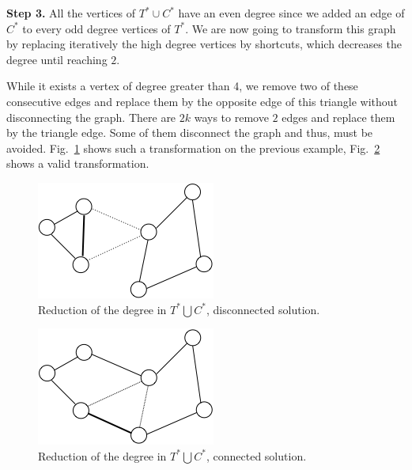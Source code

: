 \bigskip

\textbf{Step 3.} 
All the vertices of $T^* \cup C^*$ have an even degree since we added an edge of $C^*$ to every odd degree vertices of $T^*$. 
We are now going to transform this graph by replacing iteratively the high degree vertices by shortcuts, which decreases the degree until reaching $2$. 

While it exists a vertex of degree greater than 4, we remove two of these consecutive edges and replace them by the opposite edge of this triangle 
without disconnecting the graph. There are $2k$ ways to remove $2$ edges and replace them by the triangle edge. Some of them disconnect the graph
and thus, must be avoided. 
Fig.~\ref{fig:christofidesFinalStep1} shows such a transformation on the previous example, 
Fig.~\ref{fig:christofidesFinalStep2} shows a valid transformation.

\begin{figure}[h]
\begin{center}
       \includegraphics[scale=0.6]{FiguresGraph/christofides4}
       \caption{Reduction of the degree in $T^* \bigcup C^*$, disconnected solution.}
              \label{fig:christofidesFinalStep1}
\end{center}
\end{figure}

\begin{figure}[h]
\begin{center}
       \includegraphics[scale=0.6]{FiguresGraph/christofides5}
       \caption{Reduction of the degree in $T^* \bigcup C^*$, connected solution.}
       \label{fig:christofidesFinalStep2}
\end{center}
\end{figure}

